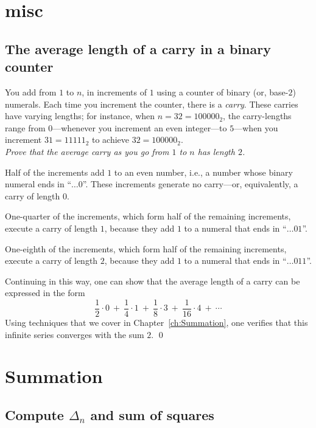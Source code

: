 \section{misc}


\subsection{The average length of a carry in a binary counter}

%
You add from $1$ to $n$, in increments of $1$ using a counter of
binary (or, base-$2$) numerals.  Each time you increment the counter,
there is a {\it carry}.  These carries have varying lengths; for
instance, when $n = 32 = 100000_2$, the carry-lengths range
from $0$---whenever you increment an even integer---to $5$---when you
increment $31 = 11111_2$ to achieve $32 = 100000_2$. \\
{\em Prove that the average carry as you go from $1$ to $n$ has length $2$.}

\medskip


\noindent
Half of the increments add $1$ to an even number, i.e., a number whose
binary numeral ends in ``$ \ldots 0$''.  These increments generate no
carry---or, equivalently, a carry of length $0$.

\noindent
One-quarter of the increments, which form half of the remaining
increments, execute a carry of length $1$, because they add $1$ to a
numeral that ends in ``$ \ldots 01$''.

\noindent
One-eighth of the increments, which form half of the remaining
increments, execute a carry of length $2$, because they add $1$ to a
numeral that ends in ``$ \ldots 011$''.

Continuing in this way, one can show that the average length of a
carry can be expressed in the form
\[ 
\frac{1}{2} \cdot 0 \ + \ \frac{1}{4} \cdot 1 \ + \ \frac{1}{8} \cdot
3 \ + \ \frac{1}{16} \cdot 4 \ + \ \cdots
\]
Using techniques that we cover in Chapter~\ref{ch:Summation}, one
verifies that this infinite series converges with the sum $2$.  \qed




\section{Summation}


\subsection{Compute $\Delta_n$ and sum of squares}

